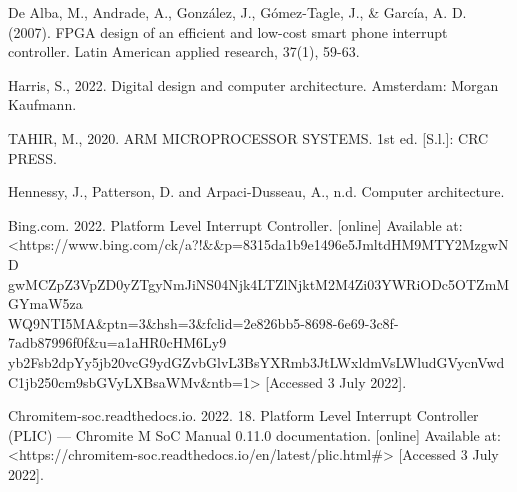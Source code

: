 \documentclass[a4paper, 11pt, oneside]{uet_thesis}  %
\begin{document}
\begin{thebibliography}{00}
	 De Alba, M., Andrade, A., González, J., Gómez-Tagle, J., \& García, A. D. (2007). FPGA design of an efficient and low-cost smart phone interrupt controller. Latin American applied research, 37(1), 59-63.

	 Harris, S., 2022. Digital design and computer architecture. Amsterdam: Morgan Kaufmann.

	 TAHIR, M., 2020. ARM MICROPROCESSOR SYSTEMS. 1st ed. [S.l.]: CRC PRESS.

	 Hennessy, J., Patterson, D. and Arpaci-Dusseau, A., n.d. Computer architecture.

	 Bing.com. 2022. Platform Level Interrupt Controller. [online] Available at: <https://www.bing.com/ck/a?!\&\&p=8315da1b9e1496e5JmltdHM9MTY2MzgwND \\ gwMCZpZ3VpZD0yZTgyNmJiNS04Njk4LTZlNjktM2M4Zi03YWRiODc5OTZmMGYmaW5za \\ WQ9NTI5MA\&ptn=3\&hsh=3\&fclid=2e826bb5-8698-6e69-3c8f-7adb87996f0f\&u=a1aHR0cHM6Ly9 \\ yb2Fsb2dpYy5jb20vcG9ydGZvbGlvL3BsYXRmb3JtLWxldmVsLWludGVycnVwdC1jb250cm9sbGVyLXBsaWMv\&ntb=1> [Accessed 3 July 2022].

	 Chromitem-soc.readthedocs.io. 2022. 18. Platform Level Interrupt Controller (PLIC) — Chromite M SoC Manual 0.11.0 documentation. [online] Available at: <https://chromitem-soc.readthedocs.io/en/latest/plic.html\#> [Accessed 3 July 2022].


	\end{thebibliography}
\end{document}

